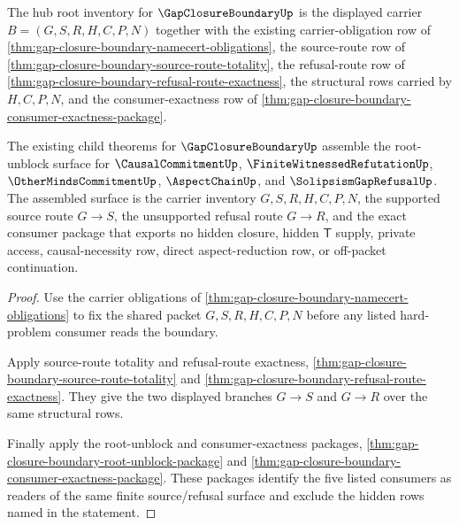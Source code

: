\begin{definition}
\label{def:gap-closure-boundary-hub-root-inventory}
The hub root inventory for $\GapClosureBoundaryUp$ is the displayed carrier $B=(G,S,R,H,C,P,N)$ together with the existing carrier-obligation row of \autoref{thm:gap-closure-boundary-namecert-obligations}, the source-route row of \autoref{thm:gap-closure-boundary-source-route-totality}, the refusal-route row of \autoref{thm:gap-closure-boundary-refusal-route-exactness}, the structural rows carried by $H,C,P,N$, and the consumer-exactness row of \autoref{thm:gap-closure-boundary-consumer-exactness-package}.
\end{definition}

\begin{theorem}
\label{thm:gap-closure-boundary-hub-root-readiness}
The existing child theorems for $\GapClosureBoundaryUp$ assemble the root-unblock surface for $\CausalCommitmentUp$, $\FiniteWitnessedRefutationUp$, $\OtherMindsCommitmentUp$, $\AspectChainUp$, and $\SolipsismGapRefusalUp$. The assembled surface is the carrier inventory $G,S,R,H,C,P,N$, the supported source route $G \longrightarrow S$, the unsupported refusal route $G \longrightarrow R$, and the exact consumer package that exports no hidden closure, hidden $\mathsf{T}$ supply, private access, causal-necessity row, direct aspect-reduction row, or off-packet continuation.
\end{theorem}
\begin{proof}
Use the carrier obligations of \autoref{thm:gap-closure-boundary-namecert-obligations} to fix the shared packet $G,S,R,H,C,P,N$ before any listed hard-problem consumer reads the boundary.

Apply source-route totality and refusal-route exactness, \autoref{thm:gap-closure-boundary-source-route-totality} and \autoref{thm:gap-closure-boundary-refusal-route-exactness}. They give the two displayed branches $G \longrightarrow S$ and $G \longrightarrow R$ over the same structural rows.

Finally apply the root-unblock and consumer-exactness packages, \autoref{thm:gap-closure-boundary-root-unblock-package} and \autoref{thm:gap-closure-boundary-consumer-exactness-package}. These packages identify the five listed consumers as readers of the same finite source/refusal surface and exclude the hidden rows named in the statement.
\end{proof}

